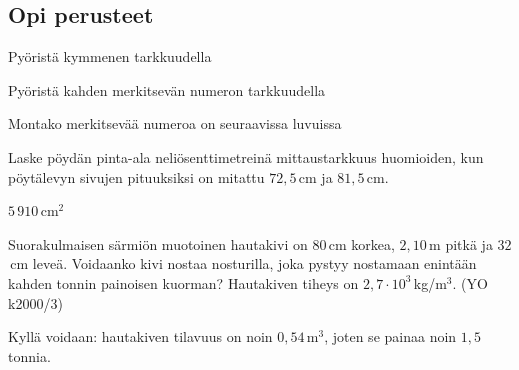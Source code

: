 
\begin{tehtavasivu}

\subsection*{Opi perusteet}

\begin{tehtava}
Pyöristä kymmenen tarkkuudella
\begin{vastaus}
\end{vastaus}
\end{tehtava}

\begin{tehtava}
Pyöristä kahden merkitsevän numeron tarkkuudella
\begin{vastaus}
\end{vastaus}
\end{tehtava}

\begin{tehtava}
Montako merkitsevää numeroa on seuraavissa luvuissa
\begin{vastaus}
\end{vastaus}
\end{tehtava}

\begin{tehtava}
Laske pöydän pinta-ala neliösenttimetreinä mittaustarkkuus huomioiden, kun pöytälevyn sivujen pituuksiksi on mitattu $72,5$\,cm ja $81,5$\,cm.
\begin{vastaus}
$5\,910$\,cm$^2$
\end{vastaus}
\end{tehtava}

\begin{tehtava}
Suorakulmaisen särmiön muotoinen hautakivi on $80$\,cm korkea, $2,10$\,m pitkä ja $32$\,cm leveä.
Voidaanko kivi nostaa nosturilla, joka pystyy nostamaan enintään kahden tonnin painoisen kuorman? Hautakiven tiheys on $2,7 \cdot 10^3$\,kg/m$^3$. (YO k2000/3)
\begin{vastaus}
Kyllä voidaan: hautakiven tilavuus on noin $0,54$\,m$^3$, joten se painaa noin $1,5$ tonnia.
\end{vastaus}
\end{tehtava}


\end{tehtavasivu}
